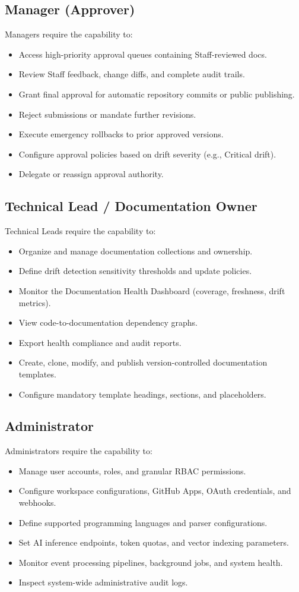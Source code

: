 \subsection{Manager (Approver)}
Managers require the capability to:
\begin{itemize}
	\item Access high-priority approval queues containing Staff-reviewed docs.
	\item Review Staff feedback, change diffs, and complete audit trails.
	\item Grant final approval for automatic repository commits or public publishing.
	\item Reject submissions or mandate further revisions.
	\item Execute emergency rollbacks to prior approved versions.
	\item Configure approval policies based on drift severity (e.g., Critical drift).
	\item Delegate or reassign approval authority.
\end{itemize}

\subsection{Technical Lead / Documentation Owner}
Technical Leads require the capability to:
\begin{itemize}
	\item Organize and manage documentation collections and ownership.
	\item Define drift detection sensitivity thresholds and update policies.
	\item Monitor the Documentation Health Dashboard (coverage, freshness, drift metrics).
	\item View code-to-documentation dependency graphs.
	\item Export health compliance and audit reports.
	\item Create, clone, modify, and publish version-controlled documentation templates.
	\item Configure mandatory template headings, sections, and placeholders.
\end{itemize}

\subsection{Administrator}
Administrators require the capability to:
\begin{itemize}
	\item Manage user accounts, roles, and granular RBAC permissions.
	\item Configure workspace configurations, GitHub Apps, OAuth credentials, and webhooks.
	\item Define supported programming languages and parser configurations.
	\item Set AI inference endpoints, token quotas, and vector indexing parameters.
	\item Monitor event processing pipelines, background jobs, and system health.
	\item Inspect system-wide administrative audit logs.
\end{itemize}

